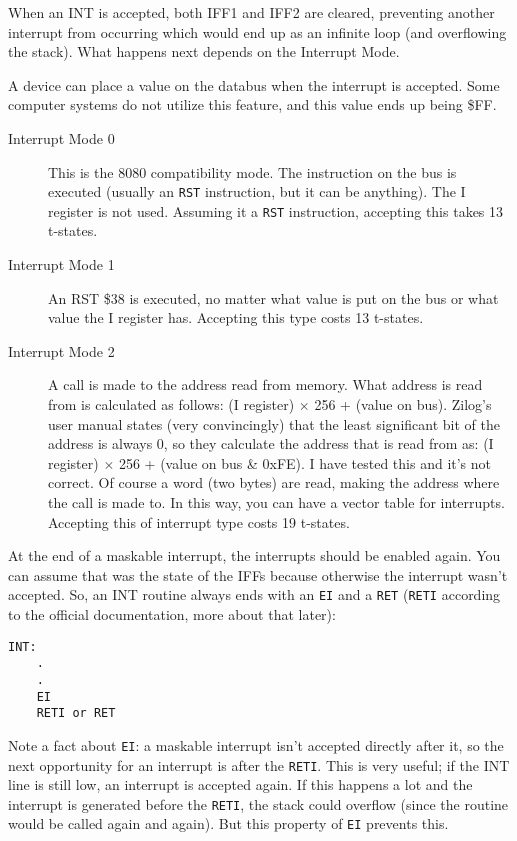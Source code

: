 \documentclass[12pt,twoside,openright,a4paper]{book}
\begin{document}
When an INT is accepted, both IFF1 and IFF2 are cleared, preventing another interrupt from occurring which would end up as an infinite loop (and overflowing the stack). What happens next depends on the Interrupt Mode.

A device can place a value on the databus when the interrupt is accepted. Some computer systems do not utilize this feature, and this value ends up being \$FF.

\begin{description}

	\item[Interrupt Mode 0]
	This is the 8080 compatibility mode. The instruction on the bus is executed (usually an {\tt RST} instruction, but it can be anything). The I register is not used. Assuming it a {\tt RST} instruction, accepting this takes 13 t-states.

	\item[Interrupt Mode 1]
	An RST \$38 is executed, no matter what value is put on the bus or what value the I register has. Accepting this type costs 13 t-states.

	\item[Interrupt Mode 2]
	A call is made to the address read from memory. What address is read from is calculated as follows: (I register) $\times$ 256 + (value on bus). Zilog's user manual states (very convincingly) that the least significant bit of the address is always 0, so they calculate the address that is read from as: (I register) $\times$ 256 + (value on bus \& 0xFE). I have tested this and it's not correct. Of course a word (two bytes) are read, making the address where the call is made to. In this way, you can have a vector table for interrupts. Accepting this of interrupt type costs 19 t-states.

\end{description}

At the end of a maskable interrupt, the interrupts should be enabled again. You can assume that was the state of the IFFs because otherwise the interrupt wasn't accepted. So, an INT routine always ends with an {\tt EI} and a {\tt RET} ({\tt RETI} according to the official documentation, more about that later):

\begin{Verbatim}
INT:
	.
	.
	EI
	RETI or RET
\end{Verbatim}

Note a fact about {\tt EI}: a maskable interrupt isn't accepted directly after it, so the next opportunity for an interrupt is after the {\tt RETI}. This is very useful; if the INT line is still low, an interrupt is accepted again.  If this happens a lot and the interrupt is generated before the {\tt RETI}, the stack could overflow (since the routine would be called again and again). But this property of {\tt EI} prevents this.
\end{document}
